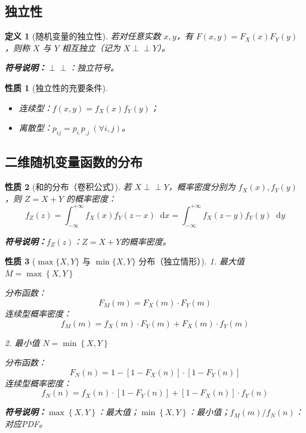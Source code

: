 \documentclass[11pt,a4paper,oneside]{article}
\theoremstyle{yhbthm}
\newtheorem{definition}{定义}[section]
\newtheorem{property}{性质}[section]
\newcommand{\dif}{\mathop{}\!\mathrm{d}}
\newcommand{\indep}{\perp \!\!\! \perp}
\newcommand{\symnote}[1]{\par\noindent\textbf{符号说明：}#1\par}
\newcommand{\maxrv}[2]{\max\left\{#1,#2\right\}}
\newcommand{\minrv}[2]{\min\left\{#1,#2\right\}}
\begin{document}
\subsection{独立性}
\begin{definition}[随机变量的独立性]
若对任意实数 $x,y$，有 $F(x,y) = F_X(x) F_Y(y)$，则称 $X$ 与 $Y$ 相互独立（记为 $X \indep Y$）。
\symnote{$\indep$：独立符号。}
\end{definition}

\begin{property}[独立性的充要条件]
\begin{itemize}
    \item 连续型：$f(x,y) = f_X(x) f_Y(y)$；
    \item 离散型：$p_{ij} = p_{i.} p_{.j} \ (\forall i,j)$。
\end{itemize}
\end{property}

\subsection{二维随机变量函数的分布}
\begin{property}[和的分布（卷积公式）]
若 $X \indep Y$，概率密度分别为 $f_X(x), f_Y(y)$，则 $Z = X + Y$ 的概率密度：
$$
f_Z(z) = \int_{-\infty}^{+\infty} f_X(x) f_Y(z - x) \dif x = \int_{-\infty}^{+\infty} f_X(z - y) f_Y(y) \dif y
$$
\symnote{$f_Z(z)$：$Z=X+Y$的概率密度。}
\end{property}

\begin{property}[$\max\{X,Y\}$ 与 $\min\{X,Y\}$ 分布（独立情形）]
1. 最大值 $M = \maxrv{X}{Y}$

分布函数：
$$
F_M(m) = F_X(m) \cdot F_Y(m)
$$
连续型概率密度：
$$
f_M(m) = f_X(m) \cdot F_Y(m) + F_X(m) \cdot f_Y(m)
$$

2. 最小值 $N = \minrv{X}{Y}$

分布函数：
$$
F_N(n) = 1 - [1 - F_X(n)] \cdot [1 - F_Y(n)]
$$
连续型概率密度：
$$
f_N(n) = f_X(n) \cdot [1 - F_Y(n)] + [1 - F_X(n)] \cdot f_Y(n)
$$
\symnote{$\maxrv{X}{Y}$：最大值；$\minrv{X}{Y}$：最小值；$f_M(m)/f_N(n)$：对应PDF。}
\end{property}
\end{document}
